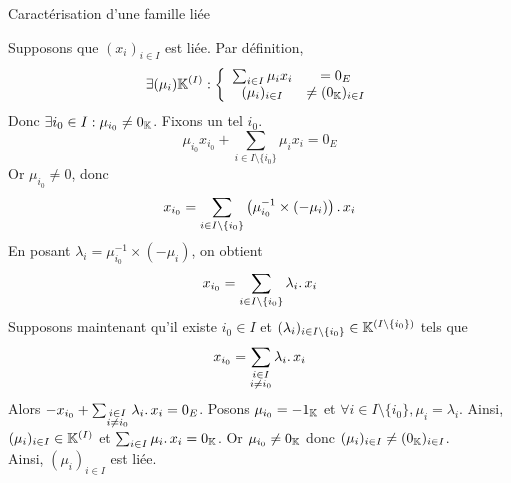\documentclass{article}
\date{15 février 2025}
\begin{document}
\maketitle

\begin{question_kholle}
	[Une famille est liée si et seulement si l'un de ses vecteurs est une combinaison linéaires d'autres vecteurs de la famille.
		\begin{equation}
			(x_i)_{i \in I} \text{ est liée}
			\iff \exists i_0 \in I : \exists (\lambda_i)_{i \in I\setminus\{i_0\}} \in \K^{\left( I \setminus \{i_0\} \right)} :
			x_{i_0} = \sum_{\substack{i \in I \\ i \neq i_0}} \lambda_i \ldotp x_i
		\end{equation}]
	{Caractérisation d'une famille liée}

	Supposons que $(x_i)_{i \in I}$ est liée.
	Par définition,
	\[\displaystyle \exists (\mu_i) \mathbb K^{(I)} :
		\left\{ \begin{array}{ccc}
			\sum_{i \in I} \mu_i x_i & = 0_E                 \\
			(\mu_i)_{i \in I}        & \neq (0_{\mathbb K})_{i \in I}
		\end{array} \right.\]
	Donc $\exists i_0 \in I : \mu_{i_0} \neq 0_{\mathbb K}$. Fixons un tel $i_0$. \\
	\[
		\mu_{i_0} x_{i_0} + \sum_{i \in I \setminus \{i_0\}} \mu_i x_i = 0_E
	\]
	Or $\mu_{i_0} \neq 0$, donc
	\[
		\displaystyle x_{i_0} = \sum_{i \in I \setminus \{i_0\}} \left( \mu_{i_0}^{-1} \times (-\mu_i) \right) \ldotp x_i
	\]
	En posant $\lambda_i = \mu_{i_0}^{-1} \times (-\mu_i)$, on obtient
	\[
		x_{i_0} = \displaystyle \sum_{i \in I \setminus \{i_0\}} \lambda_i \ldotp x_i
	\]
	Supposons maintenant qu’il existe $i_0 \in I$ et $(\lambda_i)_{i \in I\setminus\{i_0\}} \in \mathbb K^{\left( I \setminus \{i_0\} \right)}$ tels que
	\[
		x_{i_0} = \sum_{\substack{i \in I \\ i \neq i_0}} \lambda_i \ldotp x_i
	\]
	Alors $-x_{i_0} + \sum_{\substack{i \in I \\ i \neq i_0}} \lambda_i \ldotp x_i = 0_E$.
	Posons $\mu_{i_0} = - 1_{\mathbb K}$ et $\forall i \in I \!\setminus\! \{i_0\}, \mu_i = \lambda_i$.
	Ainsi, $(\mu_i)_{i \in I} \in \mathbb K^{(I)}$ et $\sum_{i \in I} \mu_i \ldotp x_i = 0_{\mathbb K}$. Or $\mu_{i_0} \neq 0_{\mathbb K}$ donc $(\mu_i)_{i \in I} \neq (0_{\mathbb K})_{i \in I}$. \\
	Ainsi, $(\mu_i)_{i \in I}$ est liée.
\end{question_kholle}
\end{document}
